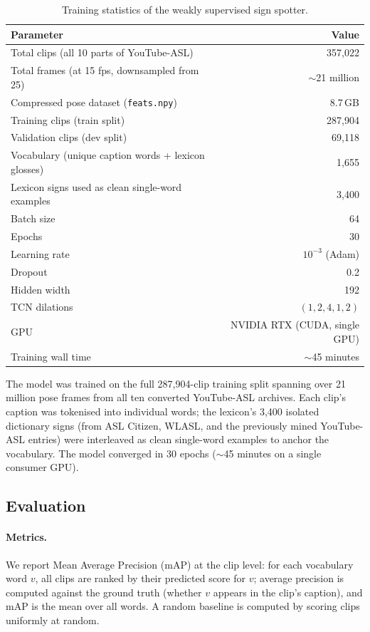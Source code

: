 \begin{table}[ht]
\centering\small
\caption{Training statistics of the weakly supervised sign spotter.}
\label{tab:spotter_train}
\begin{tabular}{l r}
\toprule
Parameter & Value \\
\midrule
Total clips (all 10 parts of YouTube-ASL) & 357,022 \\
Total frames (at 15 fps, downsampled from 25) & $\sim$21 million \\
Compressed pose dataset (\texttt{feats.npy}) & 8.7\,GB \\
Training clips (train split) & 287,904 \\
Validation clips (dev split) & 69,118 \\
Vocabulary (unique caption words + lexicon glosses) & 1,655 \\
Lexicon signs used as clean single-word examples & 3,400 \\
Batch size & 64 \\
Epochs & 30 \\
Learning rate & $10^{-3}$ (Adam) \\
Dropout & 0.2 \\
Hidden width & 192 \\
TCN dilations & $(1, 2, 4, 1, 2)$ \\
GPU & NVIDIA RTX (CUDA, single GPU) \\
Training wall time & $\sim$45 minutes \\
\bottomrule
\end{tabular}
\end{table}

The model was trained on the full 287,904-clip training split spanning over 21 million pose frames from all ten converted YouTube-ASL archives. Each clip's caption was tokenised into individual words; the lexicon's 3,400 isolated dictionary signs (from ASL Citizen, WLASL, and the previously mined YouTube-ASL entries) were interleaved as clean single-word examples to anchor the vocabulary. The model converged in 30 epochs ($\sim$45 minutes on a single consumer GPU).

\subsection{Evaluation}

\paragraph{Metrics.} We report Mean Average Precision (mAP) at the clip level: for each vocabulary word $v$, all clips are ranked by their predicted score for $v$; average precision is computed against the ground truth (whether $v$ appears in the clip's caption), and mAP is the mean over all words. A random baseline is computed by scoring clips uniformly at random.

